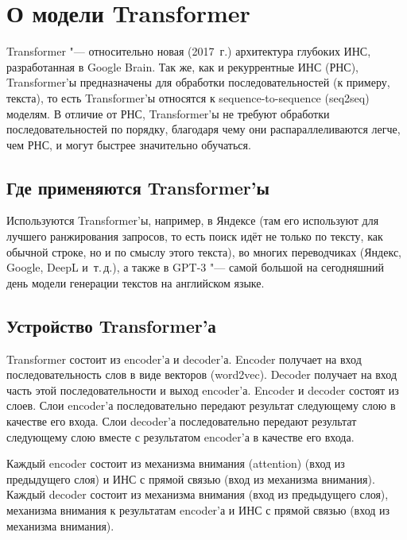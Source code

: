 \section{О модели Transformer}


Transformer "--- относительно новая (2017~г.) архитектура глубоких ИНС, разработанная в Google Brain.
Так же, как и рекуррентные ИНС (РНС), Transformer'ы предназначены для обработки последовательностей (к примеру, текста), то есть Transformer'ы относятся к sequence-to-sequence (seq2seq) моделям. В отличие от РНС, Transformer'ы не требуют обработки последовательностей по порядку, благодаря чему они распараллеливаются легче, чем РНС, и могут быстрее значительно обучаться.


\subsection{Где применяются Transformer'ы}


Используются Transformer'ы, например, в Яндексе (там его используют для лучшего ранжирования запросов, то есть поиск идёт не только по тексту, как обычной строке, но и по смыслу этого текста), во многих переводчиках (Яндекс, Google, DeepL и~т.\,д.), а также в GPT-3 "--- самой большой на сегодняшний день модели генерации текстов на английском языке.


\subsection{Устройство Transformer'а}


Transformer состоит из encoder'а и decoder'а. Encoder получает на вход последовательность слов в виде векторов (word2vec). Decoder получает на вход часть этой последовательности и выход encoder'а. Encoder и decoder состоят из слоев. Слои encoder'а последовательно передают результат следующему слою в качестве его входа. Слои decoder'а последовательно передают результат следующему слою вместе с результатом encoder'а в качестве его входа.

Каждый encoder состоит из механизма внимания (attention) (вход из предыдущего слоя) и ИНС с прямой связью (вход из механизма внимания). Каждый decoder состоит из механизма внимания (вход из предыдущего слоя), механизма внимания к результатам encoder'а и ИНС с прямой связью (вход из механизма внимания).



